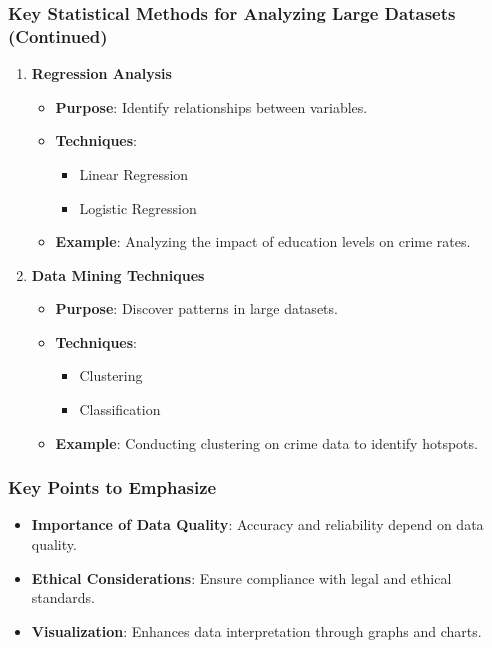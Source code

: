 \documentclass[aspectratio=169]{beamer}
\begin{document}
\begin{frame}[fragile]
    \frametitle{Key Statistical Methods for Analyzing Large Datasets (Continued)}
    \begin{enumerate}[resume]
        \item \textbf{Regression Analysis}
        \begin{itemize}
            \item \textbf{Purpose}: Identify relationships between variables.
            \item \textbf{Techniques}:
            \begin{itemize}
                \item Linear Regression
                \item Logistic Regression
            \end{itemize}
            \item \textbf{Example}: Analyzing the impact of education levels on crime rates.
        \end{itemize}

        \item \textbf{Data Mining Techniques}
        \begin{itemize}
            \item \textbf{Purpose}: Discover patterns in large datasets.
            \item \textbf{Techniques}:
            \begin{itemize}
                \item Clustering
                \item Classification
            \end{itemize}
            \item \textbf{Example}: Conducting clustering on crime data to identify hotspots.
        \end{itemize}
    \end{enumerate}
\end{frame}

\begin{frame}
    \frametitle{Key Points to Emphasize}
    \begin{itemize}
        \item \textbf{Importance of Data Quality}: Accuracy and reliability depend on data quality.
        \item \textbf{Ethical Considerations}: Ensure compliance with legal and ethical standards.
        \item \textbf{Visualization}: Enhances data interpretation through graphs and charts.
    \end{itemize}
\end{frame}
\end{document}

